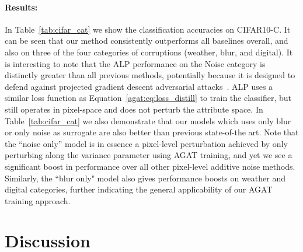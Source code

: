     \paragraph{Results:}
    
    In Table~\ref{tab:cifar_cat} we show the classification accuracies on CIFAR10-C.
    It can be seen that our method consistently outperforms all baselines overall, and also on three of the four categories of corruptions (weather, blur, and digital).
    It is interesting to note that the ALP performance on the Noise category is distinctly greater than all previous methods, potentially because it is designed to defend against projected gradient descent adversarial attacks~\citep{madry2017towards}.
    ALP uses a similar loss function as Equation~\ref{agat:eq:loss_distill} to train the classifier, but still operates in pixel-space and does not perturb the attribute space.
    In Table~\ref{tab:cifar_cat} we also demonstrate that our models which uses only blur or only noise as surrogate are also better than previous state-of-the art. Note that the ``noise only'' model is in essence a pixel-level perturbation achieved by only perturbing along the variance parameter using AGAT training, and yet we see a significant boost in performance over all other pixel-level additive noise methods.
    Similarly, the ``blur only" model also gives performance boosts on weather and digital categories, further indicating the general applicability of our AGAT training approach.


\section{Discussion}

